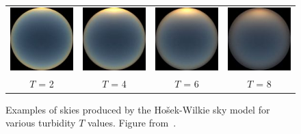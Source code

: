 

\begin{figure}
\centering
\begin{tabular}{@{}c@{}c@{}c@{}c@{}}
\includegraphics[width=0.23\linewidth]{3rdparty/hw-004.jpg} &
\includegraphics[width=0.23\linewidth]{3rdparty/hw-005.jpg} &
\includegraphics[width=0.23\linewidth]{3rdparty/hw-006.jpg} &
\includegraphics[width=0.23\linewidth]{3rdparty/hw-007.jpg} \\
$T$ = 2 & $T$ = 4 & $T$ = 6 & $T$ = 8 \\
\end{tabular}
\caption[Examples of skies produced by the Ho\v{s}ek-Wilkie sky model]{Examples of skies produced by the Ho\v{s}ek-Wilkie sky model for various turbidity $T$ values. Figure from~\cite{hosek-siggraph-12}.}
\label{fig:hw_sky_model}
\end{figure}


